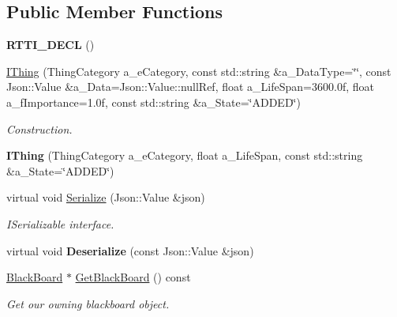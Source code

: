 \subsection*{Public Member Functions}
\begin{DoxyCompactItemize}
\item 
\mbox{\label{class_i_thing_ac32afd0e0f92d23f42125677f26ca775}} 
{\bfseries R\+T\+T\+I\+\_\+\+D\+E\+CL} ()
\item 
\mbox{\label{class_i_thing_aabf16273d837cee6bd6a92413f9eba6f}} 
\hyperlink{class_i_thing_aabf16273d837cee6bd6a92413f9eba6f}{I\+Thing} (Thing\+Category a\+\_\+e\+Category, const std\+::string \&a\+\_\+\+Data\+Type=\char`\"{}\char`\"{}, const Json\+::\+Value \&a\+\_\+\+Data=Json\+::\+Value\+::null\+Ref, float a\+\_\+\+Life\+Span=3600.\+0f, float a\+\_\+f\+Importance=1.\+0f, const std\+::string \&a\+\_\+\+State=\char`\"{}\+A\+D\+D\+E\+D\char`\"{})
\begin{DoxyCompactList}\small\item\em Construction. \end{DoxyCompactList}\item 
\mbox{\label{class_i_thing_ab1d3347e2cd73df03a8e869aa5f94ca6}} 
{\bfseries I\+Thing} (Thing\+Category a\+\_\+e\+Category, float a\+\_\+\+Life\+Span, const std\+::string \&a\+\_\+\+State=\char`\"{}A\+D\+D\+ED\char`\"{})
\item 
\mbox{\label{class_i_thing_abcd7a347d48984c860c4fe0f228ecb7f}} 
virtual void \hyperlink{class_i_thing_abcd7a347d48984c860c4fe0f228ecb7f}{Serialize} (Json\+::\+Value \&json)
\begin{DoxyCompactList}\small\item\em I\+Serializable interface. \end{DoxyCompactList}\item 
\mbox{\label{class_i_thing_a77514b40750b5dc34c948fe528a672ee}} 
virtual void {\bfseries Deserialize} (const Json\+::\+Value \&json)
\item 
\mbox{\label{class_i_thing_a301d5f8f95d9775cf8a9f85fc3af01b2}} 
\hyperlink{class_black_board}{Black\+Board} $\ast$ \hyperlink{class_i_thing_a301d5f8f95d9775cf8a9f85fc3af01b2}{Get\+Black\+Board} () const
\begin{DoxyCompactList}\small\item\em Get our owning blackboard object. \end{DoxyCompactList}\item 

\end{DoxyCompactItemize}
